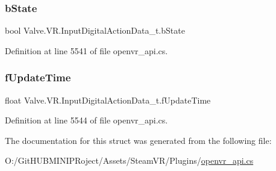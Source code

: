 \subsubsection{\texorpdfstring{bState}{bState}}
{\footnotesize\ttfamily bool Valve.\+V\+R.\+Input\+Digital\+Action\+Data\+\_\+t.\+b\+State}



Definition at line 5541 of file openvr\+\_\+api.\+cs.

\mbox{\label{struct_valve_1_1_v_r_1_1_input_digital_action_data__t_a76175e07e07bb91c07bfb6153d82dbf7}} 
\subsubsection{\texorpdfstring{fUpdateTime}{fUpdateTime}}
{\footnotesize\ttfamily float Valve.\+V\+R.\+Input\+Digital\+Action\+Data\+\_\+t.\+f\+Update\+Time}



Definition at line 5544 of file openvr\+\_\+api.\+cs.



The documentation for this struct was generated from the following file\+:\begin{DoxyCompactItemize}
\item 
O\+:/\+Git\+H\+U\+B\+M\+I\+N\+I\+P\+Roject/\+Assets/\+Steam\+V\+R/\+Plugins/\mbox{\hyperlink{openvr__api_8cs}{openvr\+\_\+api.\+cs}}\end{DoxyCompactItemize}
